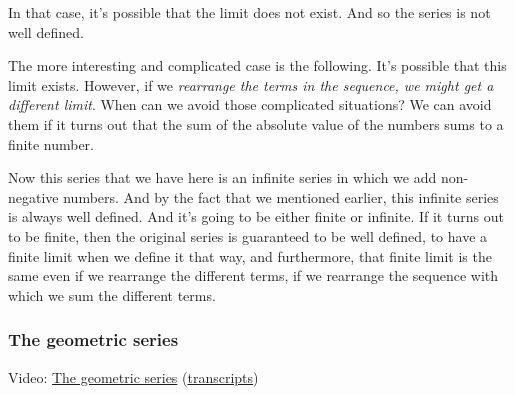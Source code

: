 \documentclass[pdftex, brazil, 12pt, twoside]{article}
\begin{document}
\begin{figure}[H]
  \begin{center}
  \end{center}
\end{figure}

In that case, it's possible that the limit does not exist.
And so the series is not well defined.

The more interesting and
complicated case is the following.
It's possible that this limit exists.
However, if we \emph{rearrange the terms in the sequence, we
might get a different limit}.
When can we avoid those complicated situations?
We can avoid them if it turns out that the sum of the
absolute value of the numbers sums to a finite number.

Now this series that we have here is an infinite series in
which we add non-negative numbers.
And by the fact that we mentioned earlier, this
infinite series is always well defined.
And it's going to be either finite or infinite.
If it turns out to be finite, then the original series is
guaranteed to be well defined, to have a finite limit when we
define it that way, and furthermore, that finite limit
is the same even if we rearrange the different terms,
if we rearrange the sequence with which we sum the
different terms.

\subsubsection{The geometric series}
\label{un1-math-geometric-series}

Video: \href{https://www.youtube.com/watch?v=friM7GDOcD0}{The geometric series}
(\href{Unit-1/02\_mathematical\_background/mb\_7\_transcripts.pdf}{transcripts})
\end{document}
